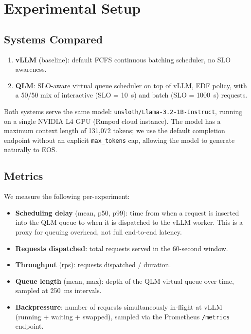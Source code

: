 \documentclass[10pt, twocolumn, letterpaper]{article}
\begin{document}
\section{Experimental Setup}

\subsection{Systems Compared}

\begin{enumerate}
    \item \textbf{vLLM} (baseline): default FCFS continuous batching scheduler, no SLO awareness.
    \item \textbf{QLM}: SLO-aware virtual queue scheduler on top of vLLM, EDF policy, with a 50/50 mix of interactive (SLO = 10~s) and batch (SLO = 1000~s) requests.
\end{enumerate}

Both systems serve the same model: \texttt{unsloth/Llama-3.2-1B-Instruct}, running on a single NVIDIA L4 GPU (Runpod cloud instance). The model has a maximum context length of 131,072 tokens; we use the default completion endpoint without an explicit \texttt{max\_tokens} cap, allowing the model to generate naturally to EOS.

\subsection{Metrics}

We measure the following per-experiment:
\begin{itemize}
    \item \textbf{Scheduling delay} (mean, p50, p99): time from when a request is inserted into the QLM queue to when it is dispatched to the vLLM worker. This is a proxy for queuing overhead, not full end-to-end latency.
    \item \textbf{Requests dispatched}: total requests served in the 60-second window.
    \item \textbf{Throughput} (rps): requests dispatched / duration.
    \item \textbf{Queue length} (mean, max): depth of the QLM virtual queue over time, sampled at 250~ms intervals.
    \item \textbf{Backpressure}: number of requests simultaneously in-flight at vLLM (running + waiting + swapped), sampled via the Prometheus \texttt{/metrics} endpoint.
\end{itemize}
\end{document}
